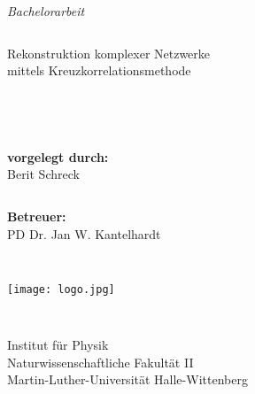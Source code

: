 \documentclass[fontsize=11pt, twoside, a4paper]{scrartcl}
\begin{document}
\pagestyle{empty}
\begin{center}\begin{Huge}
\textit{Bachelorarbeit}
\end{Huge}\end{center}
\begin{verbatim}

\end{verbatim}
\begin{center}\begin{Huge}
Rekonstruktion komplexer Netzwerke\\
 mittels Kreuzkorrelationsmethode
\end{Huge}\end{center}
\begin{verbatim}




\end{verbatim}
\begin{center}
\begin{Large}
\textbf{vorgelegt durch:}\\
Berit Schreck
\begin{verbatim}

\end{verbatim}
\textbf{Betreuer:}\\
PD Dr. Jan W. Kantelhardt\\
\end{Large}\end{center}
\begin{verbatim}


\end{verbatim}
\begin{center}
\texttt{[image: logo.jpg]}
\end{center}
\begin{verbatim}


\end{verbatim}
\begin{center}\begin{Large}
Institut für Physik\\
Naturwissenschaftliche Fakultät II\\
Martin-Luther-Universität Halle-Wittenberg\\
\end{Large}\end{center}

\newpage
\begin{verbatim}

\end{verbatim}
\newpage
\tableofcontents
\end{document}
